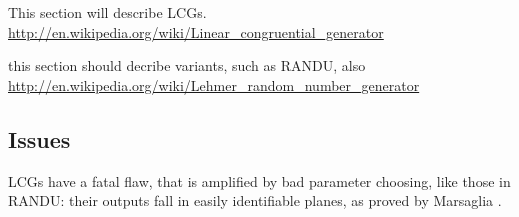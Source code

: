 This section will describe LCGs.
\url{http://en.wikipedia.org/wiki/Linear_congruential_generator}

this section should decribe variants, such as RANDU, also
\url{http://en.wikipedia.org/wiki/Lehmer_random_number_generator}

\subsection{Issues}

LCGs have a fatal flaw, that is amplified by bad parameter choosing, like those in RANDU: their outputs fall in easily identifiable planes, as proved by Marsaglia \cite{randomnumbersinplanes}.
